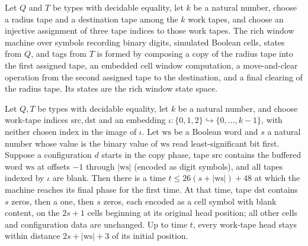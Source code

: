 \begin{definition}
\label{Turing.rt_richWindowTM}
\leanok
{}
Let $Q$ and $T$ be types with decidable equality, let $k$ be a natural number, choose a
radius tape and a destination tape among the $k$ work tapes, and choose an injective
assignment of three tape indices to those work tapes. The rich window machine over
symbols recording binary digits, simulated Boolean cells, states from $Q$, and tags from
$T$ is formed by composing a copy of the radius tape into the first assigned tape, an
embedded cell window computation, a move-and-clear operation from the second assigned
tape to the destination, and a final clearing of the radius tape. Its states are the
rich window state space.
\end{definition}

\begin{theorem}
\label{Turing.rt_richWindow_run}
\leanok
{}
Let $Q,T$ be types with decidable equality, let $k$ be a natural number, and choose
work-tape indices $\mathrm{src},\mathrm{dst}$ and an embedding
$\iota:\{0,1,2\}\hookrightarrow\{0,\ldots,k-1\}$, with neither chosen index in the image
of $\iota$. Let $\mathrm{ws}$ be a Boolean word and $s$ a natural number whose value is
the binary value of $\mathrm{ws}$ read least-significant bit first. Suppose a
configuration $d$ starts in the copy phase, tape $\mathrm{src}$ contains the buffered
word $\mathrm{ws}$ at offsets $-1$ through $|\mathrm{ws}|$ (encoded as digit symbols),
and all tapes indexed by $\iota$ are blank. Then there is a time $t\le
26(s+|\mathrm{ws}|)+48$ at which the machine reaches its final phase for the first time.
At that time, tape $\mathrm{dst}$ contains $s$ zeros, then a one, then $s$ zeros, each
encoded as a cell symbol with blank content, on the $2s+1$ cells beginning at its
original head position; all other cells and configuration data are unchanged. Up to time
$t$, every work-tape head stays within distance $2s+|\mathrm{ws}|+3$ of its initial
position.
\end{theorem}

